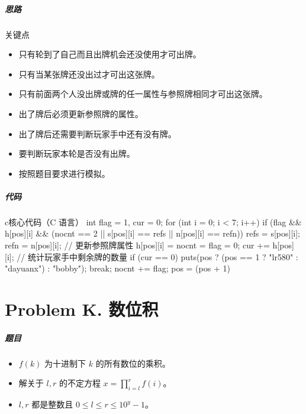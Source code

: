 \documentclass[
     aspectratio=169,                   %
]{beamer}
\begin{document}
\begin{frame}
	\frametitle{思路}
	 
	\begin{exampleblock}{关键点}
		\begin{itemize}
			\item 只有轮到了自己而且出牌机会还没使用才可出牌。
			\item 只有当某张牌还没出过才可出这张牌。
			\item 只有前面两个人没出牌或牌的任一属性与参照牌相同才可出这张牌。
			\item 出了牌后必须更新参照牌的属性。
			\item 出了牌后还需要判断玩家手中还有没有牌。
			\item 要判断玩家本轮是否没有出牌。
		\end{itemize}
	\end{exampleblock}
	\begin{itemize}
		\item 按照题目要求进行模拟。
	\end{itemize}
	
\end{frame}

\begin{frame}[fragile]
	\frametitle{代码}
	 \begin{codeblock}{c}{核心代码（C 语言）}
int flag = 1, cur = 0;
for (int i = 0; i < 7; i++) {
    if (flag && h[pos][i] && (nocnt == 2 || s[pos][i] == refs || n[pos][i] == refn)) {
        refs = s[pos][i]; refn = n[pos][i]; // 更新参照牌属性
        h[pos][i] = nocnt = flag = 0;
    }
    cur += h[pos][i]; // 统计玩家手中剩余牌的数量
}
if (cur == 0) {
    puts(pos ? (pos == 1 ? "lr580" : "dayuanx") : "bobby"); break;
}
nocnt += flag; pos = (pos + 1) %
\end{codeblock}
\end{frame}


\part{Problem K. 数位积}
\begin{frame}
	\frametitle{题目}
	
	\begin{itemize}
		\item $f(k)$ 为十进制下 $k$ 的所有数位的乘积。
		\item 解关于 $l,r$ 的不定方程 $x=\prod_{i=l}^{r}{f(i)}$。
		\item $l,r$ 都是整数且 $0\leq l \leq r \leq 10^y -1$。
	\end{itemize}
	
\end{frame}
\end{document}
